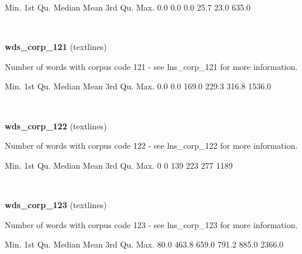 \documentclass[]{article}
\newenvironment{Shaded}{\begin{snugshade}}{\end{snugshade}}
\newcommand{\DecValTok}[1]{\textcolor[rgb]{0.00,0.00,0.81}{{#1}}}
\newcommand{\FloatTok}[1]{\textcolor[rgb]{0.00,0.00,0.81}{{#1}}}
\newcommand{\NormalTok}[1]{{#1}}
\begin{document}
\begin{Shaded}
\begin{Highlighting}[]
   \NormalTok{Min. 1st Qu.  Median    Mean 3rd Qu.    Max. }
    \FloatTok{0.0}     \FloatTok{0.0}     \FloatTok{0.0}    \FloatTok{25.7}    \FloatTok{23.0}   \FloatTok{635.0} 
\end{Highlighting}
\end{Shaded}

~

\vspace{1em}

\textbf{wds\_corp\_121} (textlines)

Number of words with corpus code 121 - see lns\_corp\_121 for more
information.

\begin{Shaded}
\begin{Highlighting}[]
   \NormalTok{Min. 1st Qu.  Median    Mean 3rd Qu.    Max. }
    \FloatTok{0.0}     \FloatTok{0.0}   \FloatTok{169.0}   \FloatTok{229.3}   \FloatTok{316.8}  \FloatTok{1536.0} 
\end{Highlighting}
\end{Shaded}

~

\vspace{1em}

\textbf{wds\_corp\_122} (textlines)

Number of words with corpus code 122 - see lns\_corp\_122 for more
information.

\begin{Shaded}
\begin{Highlighting}[]
   \NormalTok{Min. 1st Qu.  Median    Mean 3rd Qu.    Max. }
      \DecValTok{0}       \DecValTok{0}     \DecValTok{139}     \DecValTok{223}     \DecValTok{277}    \DecValTok{1189} 
\end{Highlighting}
\end{Shaded}

~

\vspace{1em}

\textbf{wds\_corp\_123} (textlines)

Number of words with corpus code 123 - see lns\_corp\_123 for more
information.

\begin{Shaded}
\begin{Highlighting}[]
   \NormalTok{Min. 1st Qu.  Median    Mean 3rd Qu.    Max. }
   \FloatTok{80.0}   \FloatTok{463.8}   \FloatTok{659.0}   \FloatTok{791.2}   \FloatTok{885.0}  \FloatTok{2366.0} 
\end{Highlighting}
\end{Shaded}
\end{document}
